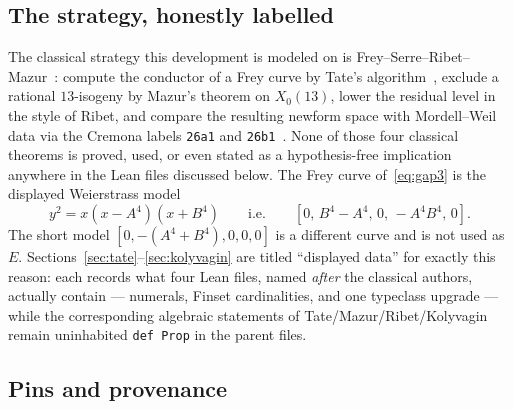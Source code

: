 \subsection*{The strategy, honestly labelled}

The classical strategy this development is modeled on is
Frey--Serre--Ribet--Mazur~\cite{frey1986,serre1987,ribet1990,mazur1978}:
compute the conductor of a Frey curve by Tate's
algorithm~\cite{tate1975}, exclude a rational $13$-isogeny by
Mazur's theorem on $X_0(13)$, lower the residual level in the
style of Ribet, and compare the resulting newform space with
Mordell--Weil data via the Cremona labels \texttt{26a1} and
\texttt{26b1}~\cite{cremona,lmfdb}. None of those four classical
theorems is proved, used, or even stated as a hypothesis-free
implication anywhere in the Lean files discussed below. The
Frey curve of~\eqref{eq:gap3} is the displayed Weierstrass model
\begin{equation}\label{eq:frey}
  y^2=x(x-A^4)(x+B^4)
  \qquad\text{i.e.}\qquad
  [0,\,B^4-A^4,\,0,\,-A^4B^4,\,0].
\end{equation}
The short model $[0,-(A^4+B^4),0,0,0]$ is a different curve and is
not used as $E$. Sections~\ref{sec:tate}--\ref{sec:kolyvagin} are
titled ``displayed data'' for exactly this reason: each records
what four Lean files, named \emph{after} the classical authors,
actually contain --- numerals, Finset cardinalities, and one
typeclass upgrade --- while the corresponding algebraic statements
of Tate/Mazur/Ribet/Kolyvagin remain uninhabited \texttt{def Prop}
in the parent files.

\subsection*{Pins and provenance}

